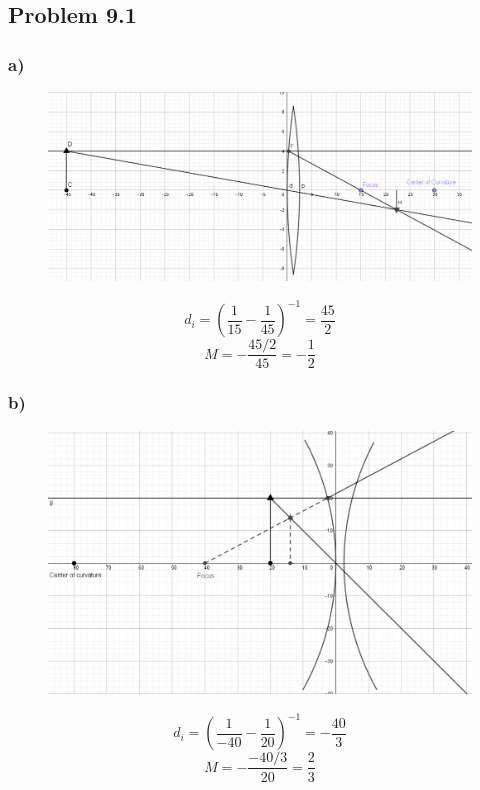 \documentclass[../homework.tex]{subfiles}
\begin{document}
\subsection{Problem 9.1}
\subsubsection*{a)}
\begin{figure}[H]
    \centering
    \includegraphics[width=\columnwidth]{p1-a.png}
\end{figure}
\begin{equation*}
    d_i = \left(\frac{1}{15} - \frac{1}{45}\right)^{-1} = \frac{45}{2}
\end{equation*}
\begin{equation*}
    M = -\frac{45/2}{45} = -\frac{1}{2} 
\end{equation*}

\subsubsection*{b)}
\begin{figure}[H]
    \centering
    \includegraphics[width=\columnwidth]{p1-b.png}
\end{figure}
\begin{equation*}
    d_i = \left(\frac{1}{-40} - \frac{1}{20}\right)^{-1} = -\frac{40}{3}
\end{equation*}
\begin{equation*}
    M = -\frac{-40/3}{20} = \frac{2}{3} 
\end{equation*}
\end{document}
